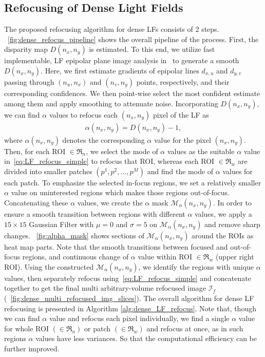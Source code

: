 \subsection{Refocusing of Dense Light Fields}\label{sec:dense_refocus}

The proposed refocusing algorithm for dense LFs consists of 2 steps. \figurename~\ref{fig:dense_refocus_pipeline} shows the overall pipeline of the process. First, the disparity map $D(n_x,n_y)$ is estimated. To this end, we utilize fast implementable, LF epipolar plane image analysis in~\cite{wanner2013variational} to generate a smooth $D(n_x,n_y)$. Here, we first estimate gradients of epipolar lines $d_{x,u}$ and $d_{y,v}$ passing through  $(n_u,n_x)$ and $(n_v,n_y)$ points, respectively, and their corresponding confidences. We then point-wise select the most confident estimate among them and apply smoothing to attenuate noise. Incorporating $D(n_x,n_y)$, we can find $\alpha$ values to refocus each $(n_x,n_y)$ pixel of the LF as 
\begin{align}\label{eq:disparity}
\alpha(n_x,n_y) = D(n_x,n_y) -1,
\end{align}
where $\alpha(n_x,n_y)$ denotes the corresponding $\alpha$ value for the pixel $(n_x,n_y)$. Then, for each ROI $\in \mathfrak{R}_{n}$, we select the mode of $\alpha$ values as the suitable $\alpha$ value in~\eqref{eq:LF_refocus_simple} to refocus that ROI, whereas each ROI $\in \mathfrak{R}_{w}$ are divided into smaller patches $(p^1, p^2, ..., p^M)$ and find the mode of $\alpha$ values for each patch. To emphasize the selected in-focus regions, we set a relatively smaller $\alpha$ value on uninterested regions which makes those regions out-of-focus. Concatenating these $\alpha$ values, we create the $\alpha$ mask $\mathcal{M}_{\alpha}(n_x,n_y)$. In order to ensure a smooth transition between regions with different $\alpha$ values, we apply a $15 \times 15$ Gaussian Filter with $\mu=0$ and $\sigma=5$ on $\mathcal{M}_{\alpha}(n_x,n_y)$ and remove sharp changes. \figurename~\ref{fig:alpha_mask} shows sections of $\mathcal{M}_{\alpha}(n_x,n_y)$ around the ROIs as heat map parts. Note that the smooth transitions between focused and out-of-focus regions, and continuous change of $\alpha$ value within ROI $\in \mathfrak{R}_{w}$ (upper right ROI). Using the constructed $\mathcal{M}_{\alpha}(n_x,n_y)$, we identify the regions with unique $\alpha$ values, then separately refocus using~\eqref{eq:LF_refocus_simple} and concatenate together to get the final multi arbitrary-volume refocused image $\mathcal{I}_f$ (\figurename~\ref{fig:dense_multi_refocused_img_slices}). The overall algorithm for dense LF refocusing is presented in Algorithm \ref{alg:dense_LF_refocus}. Note that, though we can find $\alpha$ value and refocus each pixel individually, we find a single $\alpha$ value for whole ROI $(\in \mathfrak{R}_{n})$ or patch $(\in \mathfrak{R}_{w})$ and refocus at once, as in such regions $\alpha$ values have less variances. So that the computational efficiency can be further improved.

